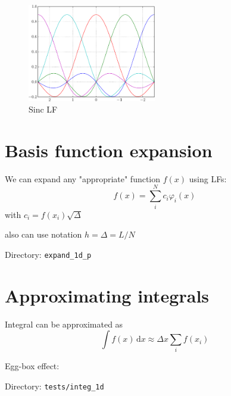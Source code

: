 \begin{figure}[h]
{\centering
\includegraphics[width=0.5\textwidth]{../../tests/plot_1d/LF1d_sinc.pdf}
\par}
\caption{Sinc LF}\label{fig:LF1d_sinc_5}
\end{figure}


\section{Basis function expansion}

We can expand any "appropriate" function $f(x)$ using LFs:
\begin{equation}
f(x) = \sum_{i}^{N} c_{i} \varphi_{i}(x)
\end{equation}
with $c_{i} = f(x_{i}) \sqrt{\Delta}$

also can use notation $h = \Delta = L/N$

Directory: \texttt{expand\_1d\_p}





\section{Approximating integrals}

Integral can be approximated as
\begin{equation}
\int f(x)\,\mathrm{d}x \approx \Delta x \sum_{i} f(x_{i})
\end{equation}

Egg-box effect:

Directory: \texttt{tests/integ\_1d}
